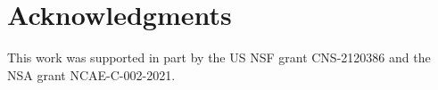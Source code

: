 \documentclass[sigconf]{acmart}
\begin{document}
\section*{Acknowledgments}
This work was supported in part by the US NSF grant CNS-2120386 and
the NSA grant NCAE-C-002-2021.

\newpage

\balance



%
%





\end{document}
